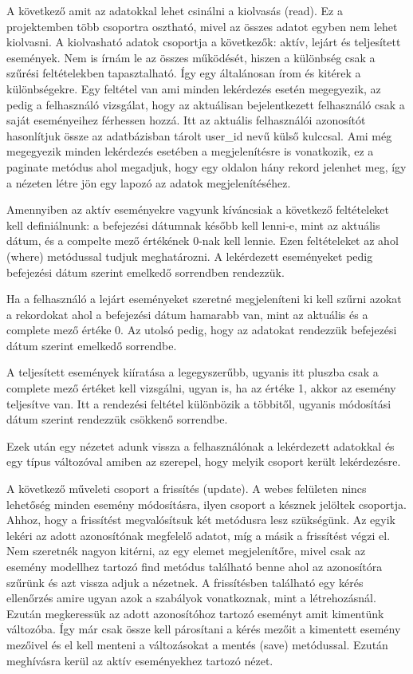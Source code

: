 \documentclass[
]{thesis-ekf}
\theoremstyle{definition}
\theoremstyle{remark}
\begin{document}
A következő amit az adatokkal lehet csinálni a kiolvasás (read). Ez a projektemben több csoportra osztható, mivel az összes adatot egyben nem lehet kiolvasni. A kiolvasható adatok csoportja a következők: aktív, lejárt és teljesített események. Nem is írnám le az összes működését, hiszen a különbség csak a szűrési feltételekben tapasztalható. Így egy általánosan írom és kitérek a különbségekre. Egy feltétel van ami minden lekérdezés esetén megegyezik, az pedig a felhasználó vizsgálat, hogy az aktuálisan bejelentkezett felhasználó csak a saját eseményeihez férhessen hozzá. Itt az aktuális felhasználói azonosítót hasonlítjuk össze az adatbázisban tárolt user\_id nevű külső kulccsal. Ami még megegyezik minden lekérdezés esetében a megjelenítésre is vonatkozik, ez a paginate metódus ahol megadjuk, hogy egy oldalon hány rekord jelenhet meg, így a nézeten létre jön egy lapozó az adatok megjelenítéséhez.

Amennyiben az aktív eseményekre vagyunk kíváncsiak a következő feltételeket kell definiálnunk: a befejezési dátumnak később kell lenni-e, mint az aktuális dátum, és a compelte mező értékének 0-nak kell lennie. Ezen feltételeket az ahol (where) metódussal tudjuk meghatározni. A lekérdezett eseményeket pedig befejezési dátum szerint emelkedő sorrendben rendezzük.

Ha a felhasználó a lejárt eseményeket szeretné megjeleníteni ki kell szűrni azokat a rekordokat ahol a befejezési dátum hamarabb van, mint az aktuális és a complete mező értéke 0. Az utolsó pedig, hogy az adatokat rendezzük befejezési dátum szerint emelkedő sorrendbe.

A teljesített események kiíratása a legegyszerűbb, ugyanis itt pluszba csak a complete mező értéket kell vizsgálni, ugyan is, ha az értéke 1, akkor az esemény teljesítve van. Itt a rendezési feltétel különbözik a többitől, ugyanis módosítási dátum szerint rendezzük csökkenő sorrendbe.

Ezek után egy nézetet adunk vissza a felhasználónak a lekérdezett adatokkal és egy típus változóval amiben az szerepel, hogy melyik csoport került lekérdezésre.

A következő műveleti csoport a frissítés (update). A webes felületen nincs lehetőség minden esemény módosításra, ilyen csoport a késznek jelöltek csoportja. Ahhoz, hogy a frissítést megvalósítsuk két metódusra lesz szükségünk. Az egyik lekéri az adott azonosítónak megfelelő adatot, míg a másik a frissítést végzi el. Nem szeretnék nagyon kitérni, az egy elemet megjelenítőre, mivel csak az esemény modellhez tartozó find metódus található benne ahol az azonosítóra szűrünk és azt vissza adjuk a nézetnek. A frissítésben található egy kérés ellenőrzés amire ugyan azok a szabályok vonatkoznak, mint a létrehozásnál. Ezután megkeressük az adott azonosítóhoz tartozó eseményt amit kimentünk változóba. Így már csak össze kell párosítani a kérés mezőit a kimentett esemény mezőivel és el kell menteni a változásokat a mentés (save) metódussal. Ezután meghívásra kerül az aktív eseményekhez tartozó nézet. 
\end{document}
